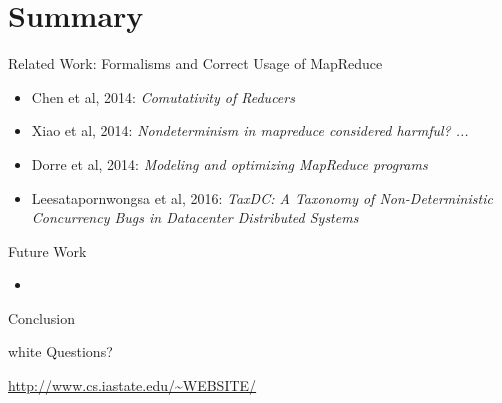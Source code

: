 \section*{Summary}

\begin{frame}{Related Work: Formalisms and Correct Usage of MapReduce}
  \begin{itemize}
    \item Chen et al, 2014: \emph{Comutativity of Reducers}
    \item Xiao et al, 2014: \emph{Nondeterminism in mapreduce considered harmful? ...}
    \item Dorre et al, 2014: \emph{Modeling and optimizing MapReduce programs}
    \item Leesatapornwongsa et al, 2016: \emph{TaxDC: A Taxonomy of
      Non-Deterministic Concurrency Bugs in Datacenter Distributed Systems}
  \end{itemize}
\end{frame}


\begin{frame}{Future Work}
  \begin{itemize}
    \item %
  \end{itemize}
\end{frame}


\begin{frame}{Conclusion}
\end{frame}


\begin{frame}
\begin{beamercolorbox}[center]{white}
  {\Large Questions?}

  \vspace{2em}\hfill

  \url{http://www.cs.iastate.edu/~WEBSITE/}
\end{beamercolorbox}
\end{frame}

